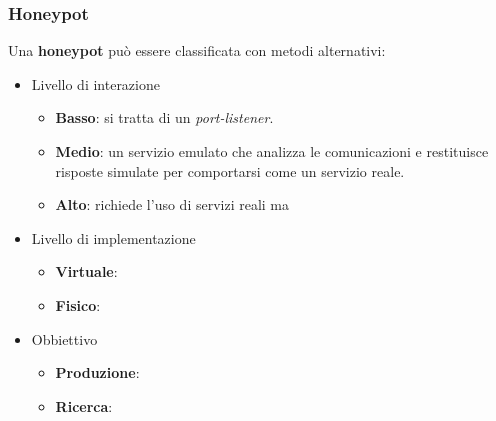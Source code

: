 \subsubsection{Honeypot}
Una \textbf{honeypot} può essere classificata con metodi alternativi:
\begin{itemize}
	\item Livello di interazione
	      \begin{itemize}
		      \item \textbf{Basso}: si tratta di un \emph{port-listener}.
		      \item \textbf{Medio}: un servizio emulato che analizza le comunicazioni e restituisce risposte simulate
		            per comportarsi come un servizio reale.
		      \item \textbf{Alto}: richiede l'uso di servizi reali ma
	      \end{itemize}
	\item Livello di implementazione
	      \begin{itemize}
		      \item \textbf{Virtuale}:
		      \item \textbf{Fisico}:
	      \end{itemize}
	\item Obbiettivo
	      \begin{itemize}
		      \item \textbf{Produzione}:
		      \item \textbf{Ricerca}:
	      \end{itemize}
\end{itemize}